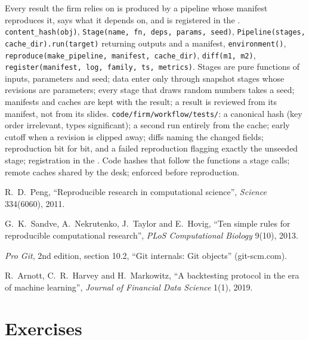 \begin{build}
 Every result the firm relies on is produced by a pipeline whose manifest reproduces it, says what it depends on, and is registered in the .
 \texttt{content\_hash(obj)}, \texttt{Stage(name, fn, deps, params, seed)}, \texttt{Pipeline(stages, cache\_dir).run(target)} returning outputs and
a manifest, \texttt{environment()}, \texttt{reproduce(make\_pipeline, manifest, cache\_dir)}, \texttt{diff(m1, m2)}, \texttt{register(manifest, log, family, ts,
metrics)}.
 Stages are pure functions of inputs, parameters and seed; data enter only through snapshot stages whose revisions are parameters; every stage that
draws random numbers takes a seed; manifests and caches are kept with the result; a result is reviewed from its manifest, not from its slides.
 \texttt{code/firm/workflow/tests/}: a canonical hash (key order irrelevant, types significant); a second run entirely from the cache; early
cutoff when a revision is clipped away; diffs naming the changed fields; reproduction bit for bit, and a failed reproduction flagging exactly the unseeded stage;
registration in the .
 Code hashes that follow the functions a stage calls; remote caches shared by the desk;  enforced before reproduction.
\end{build}

\begin{omsources}
\item R.~D.~Peng, ``Reproducible research in computational science'', \emph{Science} 334(6060), 2011.
\item G.~K.~Sandve, A.~Nekrutenko, J.~Taylor and E.~Hovig, ``Ten simple rules for reproducible computational research'', \emph{PLoS Computational Biology} 9(10),
2013.
\item \emph{Pro Git}, 2nd edition, section 10.2, ``Git internals: Git objects'' (git-scm.com).
\item R.~Arnott, C.~R.~Harvey and H.~Markowitz, ``A backtesting protocol in the era of machine learning'', \emph{Journal of Financial Data Science} 1(1), 2019.
\end{omsources}

\section{Exercises}

